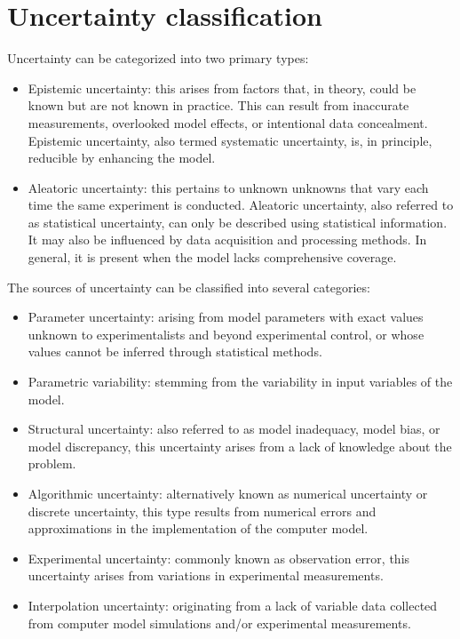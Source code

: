 \section{Uncertainty classification}

Uncertainty can be categorized into two primary types:
\begin{itemize}
    \item Epistemic uncertainty: this arises from factors that, in theory, could be known but are not known in practice. 
        This can result from inaccurate measurements, overlooked model effects, or intentional data concealment. 
        Epistemic uncertainty, also termed systematic uncertainty, is, in principle, reducible by enhancing the model.   
    \item Aleatoric uncertainty: this pertains to unknown unknowns that vary each time the same experiment is conducted. 
        Aleatoric uncertainty, also referred to as statistical uncertainty, can only be described using statistical information. 
        It may also be influenced by data acquisition and processing methods. 
        In general, it is present when the model lacks comprehensive coverage.
\end{itemize}
The sources of uncertainty can be classified into several categories:
\begin{itemize}
    \item Parameter uncertainty: arising from model parameters with exact values unknown to experimentalists and beyond experimental control, or whose values cannot be inferred through statistical methods.
    \item Parametric variability: stemming from the variability in input variables of the model. 
    \item Structural uncertainty: also referred to as model inadequacy, model bias, or model discrepancy, this uncertainty arises from a lack of knowledge about the problem.
    \item Algorithmic uncertainty: alternatively known as numerical uncertainty or discrete uncertainty, this type results from numerical errors and approximations in the implementation of the computer model.
    \item Experimental uncertainty: commonly known as observation error, this uncertainty arises from variations in experimental measurements.
    \item Interpolation uncertainty: originating from a lack of variable data collected from computer model simulations and/or experimental measurements.
\end{itemize}